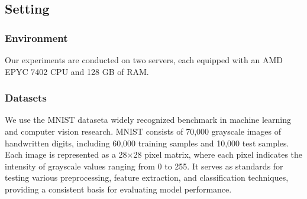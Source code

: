 \documentclass[conference]{IEEEtran}
\begin{document}
\subsection{Setting}
\subsubsection{Environment} Our experiments are conducted on two servers, each equipped with an AMD EPYC 7402 CPU and 128 GB of RAM.






\subsubsection{Datasets} 
We use the MNIST dataset\cite{xiao2017fashion}a widely recognized benchmark in machine learning and computer vision research. MNIST consists of 70,000 grayscale images of handwritten digits, including 60,000 training samples and 10,000 test samples. Each image is represented as a 28$\times$28 pixel matrix, where each pixel indicates the intensity of grayscale values ranging from 0 to 255. 
It serves as standards for testing various preprocessing, feature extraction, and classification techniques, providing a consistent basis for evaluating model performance.
\end{document}
